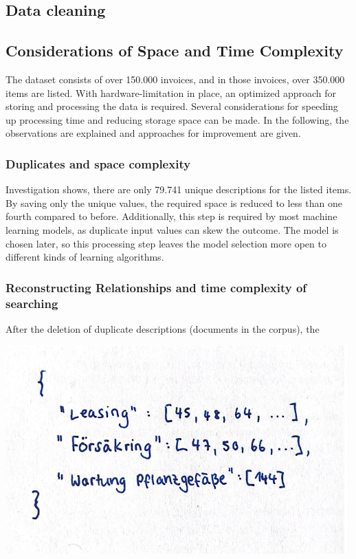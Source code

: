 	
	\subsection{Data cleaning}
	
	\subsection{Considerations of Space and Time Complexity}
	The dataset consists of over 150.000 invoices, and in those invoices, over 350.000 items are listed. 
	With hardware-limitation in place, an optimized approach for storing and processing the data is required. 
	Several considerations for speeding up processing time and reducing storage space can be made. 
	In the following, the observations are explained and approaches for improvement are given.

		\subsubsection{Duplicates and space complexity}
		Investigation shows, there are only 79.741 unique descriptions for the listed items. By saving only the unique values, the required space is reduced to less than one fourth compared to before. Additionally, this step is required by most machine learning models, as duplicate input values can skew the outcome. The model is chosen later, so this processing step leaves the model selection more open to different kinds of learning algorithms.
		
		\subsubsection{Reconstructing Relationships and time complexity of searching}
		After the deletion of duplicate descriptions (documents in the corpus), the 
		
		\includegraphics[height=8cm]{Bilder/description_map.png}

